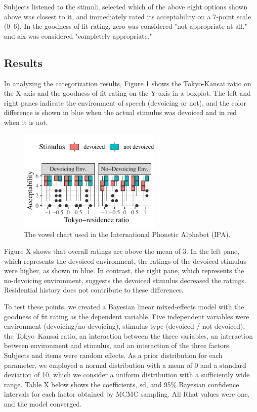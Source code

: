 \documentclass[a4paper,11pt,twocolumn]{article}
\begin{document}
Subjects listened to the stimuli, selected which of the above eight options shown above was closest to it, and immediately rated its acceptability on a 7-point scale (0--6). In the goodness of fit rating, zero was considered "not appropriate at all," and six was considered "completely appropriate."

\subsection{Results}

In analyzing the categorization results, Figure \ref{fig:cat_results} shows the Tokyo-Kansai ratio on the X-axis and the goodness of fit rating on the Y-axis in a boxplot. The left and right panes indicate the environment of speech (devoicing or not), and the color difference is shown in blue when the actual stimulus was devoiced and in red when it is not.

\begin{figure}[!ht]
\begin{center}
\includegraphics[width=7cm]{../results/artifact/results_categorization.pdf}
\caption{The vowel chart used in the International Phonetic
Alphabet (IPA).}\label{fig:cat_results}
\end{center}
\end{figure}

Figure X shows that overall ratings are above the mean of 3. In the left pane, which represents the devoiced environment, the ratings of the devoiced stimulus were higher, as shown in blue. In contrast, the right pane, which represents the no-devoicing environment, suggests the devoiced stimulus decreased the ratings. Residential history does not contribute to these differences.

To test these points, we created a Bayesian linear mixed-effects model with the goodness of fit rating as the dependent variable. Five independent variables were environment (devoicing/no-devoicing), stimulus type (devoiced / not devoiced), the Tokyo--Kansai ratio, an interaction between the three variables, an interaction between environment and stimulus, and an interaction of the three factors. Subjects and items were random effects. As a prior distribution for each parameter, we employed a normal distribution with a mean of 0 and a standard deviation of 10, which we consider a uniform distribution with a sufficiently wide range. Table X below shows the coefficients, sd, and 95\% Bayesian confidence intervals for each factor obtained by MCMC sampling. All Rhat values were one, and the model converged.
\end{document}
